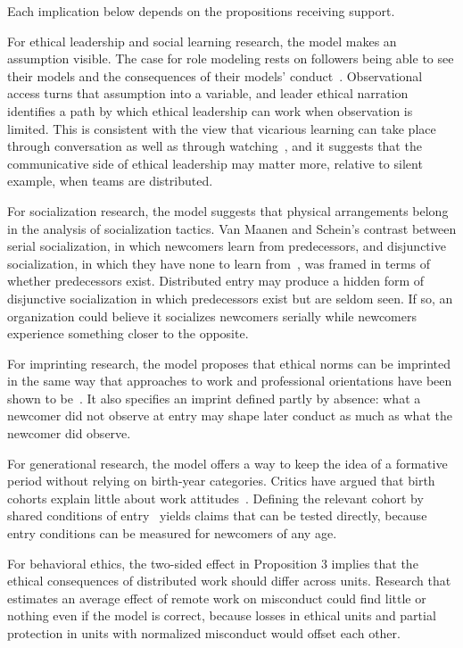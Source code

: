 \documentclass[12pt,a4paper]{article}
\theoremstyle{definition}
\begin{document}
Each implication below depends on the propositions receiving support.

For ethical leadership and social learning research, the model makes an assumption visible. The case for role modeling rests on followers being able to see their models and the consequences of their models' conduct~\citep{brown2005ethical,brown2006ethical}. Observational access turns that assumption into a variable, and leader ethical narration identifies a path by which ethical leadership can work when observation is limited. This is consistent with the view that vicarious learning can take place through conversation as well as through watching~\citep{myers2018coactive}, and it suggests that the communicative side of ethical leadership may matter more, relative to silent example, when teams are distributed.

For socialization research, the model suggests that physical arrangements belong in the analysis of socialization tactics. Van Maanen and Schein's contrast between serial socialization, in which newcomers learn from predecessors, and disjunctive socialization, in which they have none to learn from~\citep{vanmaanen1979toward}, was framed in terms of whether predecessors exist. Distributed entry may produce a hidden form of disjunctive socialization in which predecessors exist but are seldom seen. If so, an organization could believe it socializes newcomers serially while newcomers experience something closer to the opposite.

For imprinting research, the model proposes that ethical norms can be imprinted in the same way that approaches to work and professional orientations have been shown to be~\citep{tilcsik2014imprint,azoulay2017social}. It also specifies an imprint defined partly by absence: what a newcomer did not observe at entry may shape later conduct as much as what the newcomer did observe.

For generational research, the model offers a way to keep the idea of a formative period without relying on birth-year categories. Critics have argued that birth cohorts explain little about work attitudes~\citep{costanza2015generationally,rudolph2017considering}. Defining the relevant cohort by shared conditions of entry~\citep{joshi2010unpacking} yields claims that can be tested directly, because entry conditions can be measured for newcomers of any age.

For behavioral ethics, the two-sided effect in Proposition 3 implies that the ethical consequences of distributed work should differ across units. Research that estimates an average effect of remote work on misconduct could find little or nothing even if the model is correct, because losses in ethical units and partial protection in units with normalized misconduct would offset each other.
\end{document}
